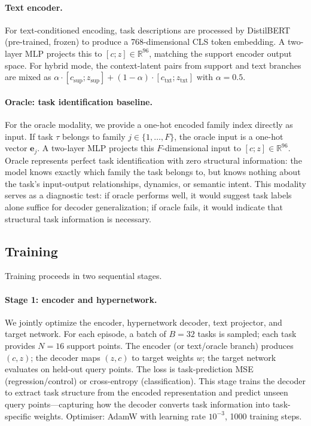 \paragraph{Text encoder.}
For text-conditioned encoding, task descriptions are processed by DistilBERT (pre-trained, frozen) to produce a 768-dimensional CLS token embedding.
A two-layer MLP projects this to $[c; z] \in \mathbb{R}^{96}$, matching the support encoder output space.
For hybrid mode, the context-latent pairs from support and text branches are mixed as $\alpha \cdot [c_{\text{sup}}; z_{\text{sup}}] + (1-\alpha) \cdot [c_{\text{txt}}; z_{\text{txt}}]$ with $\alpha = 0.5$.
\paragraph{Oracle: task identification baseline.}
For the oracle modality, we provide a one-hot encoded family index directly as input.
If task $\tau$ belongs to family $j \in \{1, \ldots, F\}$, the oracle input is a one-hot vector $\mathbf{e}_j$.
A two-layer MLP projects this $F$-dimensional input to $[c; z] \in \mathbb{R}^{96}$.
Oracle represents perfect task identification with zero structural information: the model knows exactly which family the task belongs to, but knows nothing about the task's input-output relationships, dynamics, or semantic intent.
This modality serves as a diagnostic test: if oracle performs well, it would suggest task labels alone suffice for decoder generalization; if oracle fails, it would indicate that structural task information is necessary.
\subsection{Training}

Training proceeds in two sequential stages.

\paragraph{Stage 1: encoder and hypernetwork.}
We jointly optimize the encoder, hypernetwork decoder, text projector, and target network.
For each episode, a batch of $B{=}32$ tasks is sampled; each task provides $N{=}16$ support points.
The encoder (or text/oracle branch) produces $(c, z)$; the decoder maps $(z, c)$ to target weights $w$; the target network evaluates on held-out query points.
The loss is task-prediction MSE (regression/control) or cross-entropy (classification).
This stage trains the decoder to extract task structure from the encoded representation and predict unseen query points---capturing how the decoder converts task information into task-specific weights.
Optimiser: AdamW with learning rate $10^{-3}$, 1000 training steps.

